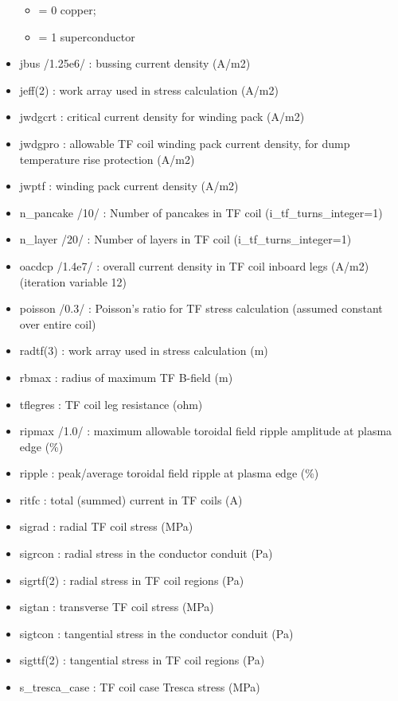 \documentclass[]{article}
\providecommand{\tightlist}{%
  \setlength{\itemsep}{0pt}\setlength{\parskip}{0pt}}
\begin{document}
\begin{itemize}
  \begin{itemize}
  \tightlist
  \item
    = 0 copper;
  \item
    = 1 superconductor
  \end{itemize}
\item
  jbus /1.25e6/ : bussing current density (A/m2)
\item
  jeff(2) : work array used in stress calculation (A/m2)
\item
  jwdgcrt : critical current density for winding pack (A/m2)
\item
  jwdgpro : allowable TF coil winding pack current density, for dump
  temperature rise protection (A/m2)
\item
  jwptf : winding pack current density (A/m2)
\item
  n\_pancake /10/ : Number of pancakes in TF coil
  (i\_tf\_turns\_integer=1)
\item
  n\_layer /20/ : Number of layers in TF coil (i\_tf\_turns\_integer=1)
\item
  oacdcp /1.4e7/ : overall current density in TF coil inboard legs
  (A/m2) (iteration variable 12)
\item
  poisson /0.3/ : Poisson's ratio for TF stress calculation (assumed
  constant over entire coil)
\item
  radtf(3) : work array used in stress calculation (m)
\item
  rbmax : radius of maximum TF B-field (m)
\item
  tflegres : TF coil leg resistance (ohm)
\item
  ripmax /1.0/ : maximum allowable toroidal field ripple amplitude at
  plasma edge (\%)
\item
  ripple : peak/average toroidal field ripple at plasma edge (\%)
\item
  ritfc : total (summed) current in TF coils (A)
\item
  sigrad : radial TF coil stress (MPa)
\item
  sigrcon : radial stress in the conductor conduit (Pa)
\item
  sigrtf(2) : radial stress in TF coil regions (Pa)
\item
  sigtan : transverse TF coil stress (MPa)
\item
  sigtcon : tangential stress in the conductor conduit (Pa)
\item
  sigttf(2) : tangential stress in TF coil regions (Pa)
\item
  s\_tresca\_case : TF coil case Tresca stress (MPa)

\end{itemize}
\end{document}
